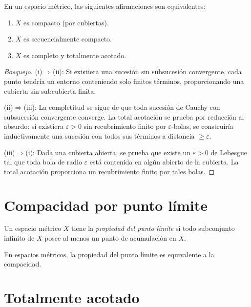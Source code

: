 \begin{theorem}
\label{teo:equivalencia-compacidad}
En un espacio métrico, las siguientes afirmaciones son equivalentes:
\begin{enumerate}
  \item[(i)] $X$ es compacto (por cubiertas).
  \item[(ii)] $X$ es secuencialmente compacto.
  \item[(iii)] $X$ es completo y totalmente acotado.
\end{enumerate}
\end{theorem}
\begin{proof}[Bosquejo]
(i)$\Rightarrow$(ii): Si existiera una sucesión sin subsucesión convergente, cada punto tendría un entorno conteniendo solo finitos términos, proporcionando una cubierta sin subcubierta finita.

(ii)$\Rightarrow$(iii): La completitud se sigue de que toda sucesión de Cauchy con subsucesión convergente converge. La total acotación se prueba por reducción al absurdo: si existiera $\varepsilon>0$ sin recubrimiento finito por $\varepsilon$-bolas, se construiría inductivamente una sucesión con todos sus términos a distancia $\geq\varepsilon$.

(iii)$\Rightarrow$(i): Dada una cubierta abierta, se prueba que existe un $\varepsilon>0$ de Lebesgue tal que toda bola de radio $\varepsilon$ está contenida en algún abierto de la cubierta. La total acotación proporciona un recubrimiento finito por tales bolas.
\end{proof}

\section{Compacidad por punto límite}

\begin{definition}
\label{def:punto-limite}
Un espacio métrico $X$ tiene la \emph{propiedad del punto límite} si todo subconjunto infinito de $X$ posee al menos un punto de acumulación en $X$.
\end{definition}

\begin{proposition}
\label{prop:punto-limite-equivalente}
En espacios métricos, la propiedad del punto límite es equivalente a la compacidad.
\end{proposition}

\section{Totalmente acotado}

